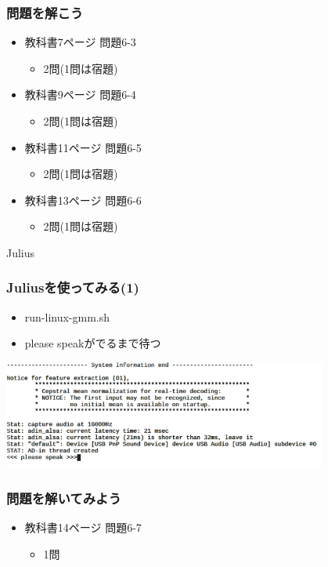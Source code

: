 \documentclass[14pt]{beamer}
\begin{document}
\begin{frame}
  \frametitle{問題を解こう}
  \begin{itemize}
    \item 教科書7ページ 問題6-3
    \begin{itemize}
      \item 2問(1問は宿題)
    \end{itemize}

    \item 教科書9ページ 問題6-4
    \begin{itemize}
      \item 2問(1問は宿題)
    \end{itemize}

    \item 教科書11ページ 問題6-5
    \begin{itemize}
      \item 2問(1問は宿題)
    \end{itemize}

    \item 教科書13ページ 問題6-6
    \begin{itemize}
      \item 2問(1問は宿題)
    \end{itemize}
  \end{itemize}
  
\end{frame}

\begin{frame}
  \centering
  {\Large Julius}
\end{frame}

\begin{frame}
  \frametitle{Juliusを使ってみる(1)}
  \begin{itemize}
    \item run-linux-gmm.sh
    \item \<\<please speak\>\>がでるまで待つ
  \end{itemize}
  \centering
  \includegraphics[width=0.8\textwidth]{chap06/text06-img009.png}
\end{frame}

\begin{frame}
  \frametitle{問題を解いてみよう}
  \begin{itemize}
    \item 教科書14ページ 問題6-7
    \begin{itemize}
      \item 1問
    \end{itemize}
  \end{itemize}
\end{frame}
\end{document}
